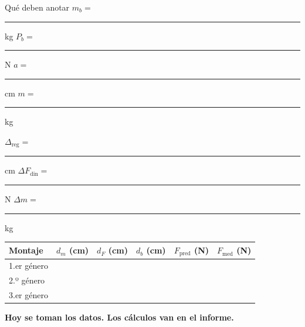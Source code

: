 \documentclass[aspectratio=169,xcolor=dvipsnames]{beamer}
\begin{document}
	\begin{frame}{Qué deben anotar}
		\centering
		\small
		$m_b = $ \rule{1.3cm}{0.4pt} kg \quad
		$P_b = $ \rule{1.3cm}{0.4pt} N \quad
		$a = $ \rule{1.3cm}{0.4pt} cm \quad
		$m = $ \rule{1.3cm}{0.4pt} kg
		
		\vspace{0.2cm}
		$\Delta_{\text{reg}} = $ \rule{1.3cm}{0.4pt} cm \qquad
		$\Delta F_{\text{din}} = $ \rule{1.3cm}{0.4pt} N \qquad
		$\Delta m = $ \rule{1.3cm}{0.4pt} kg
		
		\vspace{0.5cm}
		\setlength{\tabcolsep}{6pt}
		\renewcommand{\arraystretch}{1.6}
		\begin{tabular}{|l|c|c|c|c|c|}
			\hline
			Montaje & $d_m$ (cm) & $d_F$ (cm) & $d_b$ (cm)
			& $F_{\text{pred}}$ (N) & $F_{\text{med}}$ (N) \\
			\hline
			1.er género & & & & & \\ \hline
			2.º género & & & & & \\ \hline
			3.er género & & & & & \\ \hline
		\end{tabular}
		
		\vspace{0.4cm}
		\normalsize
		\textcolor{UnalGreen}{\textbf{Hoy se toman los datos. Los cálculos van en el informe.}}
	\end{frame}
	
\end{document}
